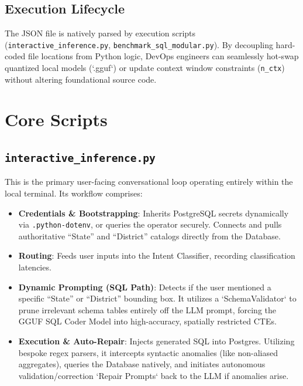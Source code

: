 \documentclass[12pt,a4paper]{article}
\begin{document}
\subsection{Execution Lifecycle}
The JSON file is natively parsed by execution scripts (\texttt{interactive\_inference.py}, \texttt{benchmark\_sql\_modular.py}). By decoupling hard-coded file locations from Python logic, DevOps engineers can seamlessly hot-swap quantized local models (`.gguf`) or update context window constraints (\texttt{n\_ctx}) without altering foundational source code.

\section{Core Scripts}

\subsection{\texttt{interactive\_inference.py}}
This is the primary user-facing conversational loop operating entirely within the local terminal. Its workflow comprises:
\begin{itemize}[label=\textcolor{primary}{\textbullet}]
    \item \textbf{Credentials \& Bootstrapping}: Inherits PostgreSQL secrets dynamically via \texttt{.python-dotenv}, or queries the operator securely. Connects and pulls authoritative ``State'' and ``District'' catalogs directly from the Database.
    \item \textbf{Routing}: Feeds user inputs into the Intent Classifier, recording classification latencies. 
    \item \textbf{Dynamic Prompting (SQL Path)}: Detects if the user mentioned a specific ``State'' or ``District'' bounding box. It utilizes a `SchemaValidator` to prune irrelevant schema tables entirely off the LLM prompt, forcing the GGUF SQL Coder Model into high-accuracy, spatially restricted CTEs.
    \item \textbf{Execution \& Auto-Repair}: Injects generated SQL into Postgres. Utilizing bespoke regex parsers, it intercepts syntactic anomalies (like non-aliased aggregates), queries the Database natively, and initiates autonomous validation/correction `Repair Prompts` back to the LLM if anomalies arise.
\end{itemize}
\end{document}
